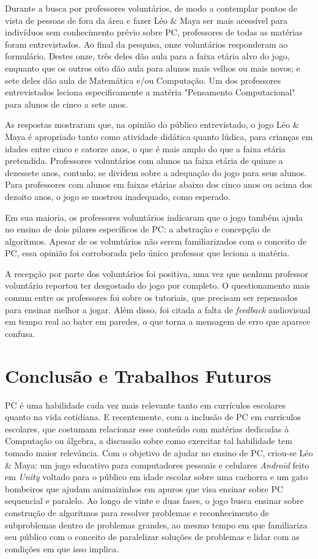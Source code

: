 \documentclass[conference]{IEEEtran}
\begin{document}
Durante a busca por professores voluntários, de modo a contemplar pontos de vista de pessoas de fora da área e fazer Léo \& Maya ser mais acessível para indivíduos sem conhecimento prévio sobre PC, professores de todas as matérias foram entrevistados. Ao final da pesquisa, onze voluntários responderam ao formulário. Destes onze, três deles dão aula para a faixa etária alvo do jogo, enquanto que os outros oito dão aula para alunos mais velhos ou mais novos; e sete deles dão aula de Matemática e/ou Computação. Um dos professores entrevistados leciona especificamente a matéria "Pensamento Computacional" para alunos de cinco a sete anos.

As respostas mostraram que, na opinião do público entrevistado, o jogo Léo \& Maya é apropriado tanto como atividade didática quanto lúdica, para crianças em idades entre cinco e catorze anos, o que é mais amplo do que a faixa etária pretendida. Professores voluntários com alunos na faixa etária de quinze a dezessete anos, contudo, se dividem sobre a adequação do jogo para seus alunos. Para professores com alunos em faixas etárias abaixo dos cinco anos ou acima dos dezoito anos, o jogo se mostrou inadequado, como esperado.

Em sua maioria, os professores voluntários indicaram que o jogo também ajuda no ensino de dois pilares específicos de PC: a abstração e concepção de algoritmos. Apesar de os voluntários não serem familiarizados com o conceito de PC, essa opinião foi corroborada pelo único professor que leciona a matéria.

A recepção por parte dos voluntários foi positiva, uma vez que nenhum professor voluntário reportou ter desgostado do jogo por completo. O questionamento mais comum entre os professores foi sobre os tutoriais, que precisam ser repensados para ensinar melhor a jogar. Além disso, foi citada a falta de \textit{feedback} audiovisual em tempo real ao bater em paredes, o que torna a mensagem de erro que aparece confusa.

\section{Conclusão e Trabalhos Futuros}

PC é uma habilidade cada vez mais relevante tanto em currículos escolares quanto na vida cotidiana. E recentemente, com a inclusão de PC em currículos escolares, que costumam relacionar esse conteúdo com matérias dedicadas à Computação ou álgebra, a discussão sobre como exercitar tal habilidade tem tomado maior relevância. Com o objetivo de ajudar no ensino de PC, criou-se Léo \& Maya: um jogo educativo para computadores pessoais e celulares \textit{Android} feito em \textit{Unity} voltado para o público em idade escolar sobre uma cachorra e um gato bombeiros que ajudam animaizinhos em apuros que visa ensinar sobre PC sequencial e paralelo. Ao longo de vinte e duas fases, o jogo busca ensinar sobre construção de algoritmos para resolver problemas e reconhecimento de subproblemas dentro de problemas grandes, ao mesmo tempo em que familiariza seu público com o conceito de paralelizar soluções de problemas e lidar com as condições em que isso implica. 
\end{document}
